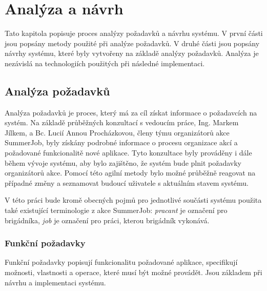 \chapter{Analýza a návrh}

Tato kapitola popisuje proces analýzy požadavků a návrhu systému.
V první části jsou popsány metody použité při analýze požadavků. V druhé části jsou popsány návrhy systému, které byly vytvořeny na základě analýzy požadavků.
Analýza je nezávislá na technologiích použitých při následné implementaci.

\section{Analýza požadavků}

Analýza požadavků je proces, který má za cíl získat informace o požadavcích na systém. Na základě průběžných konzultací s vedoucím práce, Ing. Markem Jílkem, a 
Bc. Lucií Annou Procházkovou, členy týmu organizátorů akce SummerJob, byly získány podrobné informace o procesu organizace akcí a požadované funkcionalitě nové aplikace.
Tyto konzultace byly prováděny i dále během vývoje systému, aby bylo zajištěno, že systém bude plnit požadavky organizátorů akce. Pomocí této agilní metody
bylo možné průběžně reagovat na případné změny a seznamovat budoucí uživatele s aktuálním stavem systému.

V této práci bude kromě obecných pojmů pro jednotlivé součásti systému použita také existující terminologie z akce SummerJob: \textit{pracant} je označení pro brigádníka, \textit{job} je označení pro práci, kterou brigádník vykonává.

\subsection{Funkční požadavky}
\label{sec:functional-requirements}

Funkční požadavky popisují funkcionalitu požadované aplikace, specifikují možnosti, vlastnosti a operace, které musí být možné provádět.
Jsou základem při návrhu a implementaci systému.

